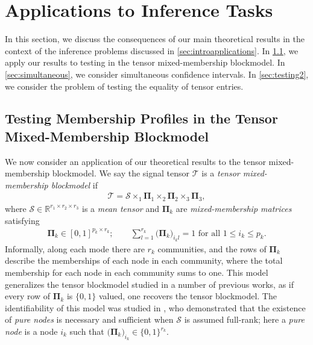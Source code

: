 \documentclass[10pt]{article}
\newcommand{\0}{{\mathbf{0}}}
\newcommand{\1}{{\mathbf{1}}}
\renewcommand{\citet}{\cite}
\newcommand{\red}{\color{red}}
\begin{document}


\section{Applications to Inference Tasks}
\label{sec:consequences}
In this section, we discuss the consequences of our main theoretical results in the context of the inference problems discussed in \cref{sec:introapplications}.   In \cref{sec:testing}, we apply our results to testing in the tensor mixed-membership blockmodel. In \cref{sec:simultaneous}, we consider simultaneous confidence intervals. In \cref{sec:testing2}, we consider the problem of testing the equality of tensor entries.  


\subsection{Testing  Membership Profiles in the Tensor Mixed-Membership Blockmodel} \label{sec:testing}
We now consider an application of our theoretical results to the tensor mixed-membership blockmodel. %
We say the signal tensor $\mathcal{T}$ is a \emph{tensor mixed-membership blockmodel} \citep{agterberg_estimating_2022} if
\begin{align*}
    \mathcal{T} = \mathcal{S} \times_1 \mathbf{\Pi}_1 \times_2 \mathbf{\Pi}_2 \times_3 \mathbf{\Pi}_3,
\end{align*}
where $\mathcal{S} \in \mathbb{R}^{r_1 \times r_2 \times r_3}$ is a \emph{mean tensor} and $\mathbf{\Pi}_k$ are \emph{mixed-membership matrices} satisfying
\begin{align*}
    \mathbf{\Pi}_k \in [0,1]^{p_k \times r_k}; \qquad \sum_{l=1}^{r_k} \big( \mathbf{\Pi}_k \big)_{i_k l} = 1  \text{ for all } 1 \leq i_k \leq p_k.
\end{align*}
Informally, along each mode there are $r_k$ communities, and the rows of $\mathbf{\Pi}_k$ describe the memberships of each node in each community, where the total membership for each node in each community sums to one.  This model generalizes the tensor blockmodel studied in a number of previous works, as if every row of $\mathbf{\Pi}_k$ is $\{0,1\}$ valued, one recovers the tensor blockmodel.  The identifiability of this model was studied in \citet{agterberg_estimating_2022}, who demonstrated that the existence of \emph{pure nodes} is necessary and sufficient when $\mathcal{S}$ is assumed full-rank; here a \emph{pure node} is a node $i_k$ such that $\big(\mathbf{\Pi}_k\big)_{i_k} \in \{0,1\}^{r_k}$.  
\end{document}
